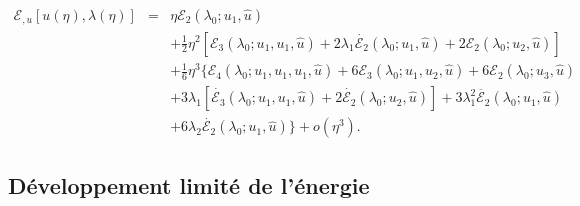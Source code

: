 \documentclass{article}
\begin{document}
\begin{eqnarray}
  \mathcal{E}_{, u} [u (\eta), \lambda (\eta)] & = & \eta \mathcal{E}_2
  (\lambda_0 ; u_1, \hat{u}) \nonumber\\
  &  &  + \tfrac{1}{2} \eta^2  [\mathcal{E}_3 (\lambda_0 ; u_1, u_1,
  \hat{u}) + 2 \lambda_1  \dot{\mathcal{E}_2} (\lambda_0 ; u_1, \hat{u}) +
  2\mathcal{E}_2 (\lambda_0 ; u_2, \hat{u})] \nonumber\\
  &  &  + \tfrac{1}{6} \eta^3  \{ \mathcal{E}_4 (\lambda_0 ; u_1,
  u_1, u_1, \hat{u}) + 6\mathcal{E}_3 (\lambda_0 ; u_1, u_2, \hat{u})
   + 6\mathcal{E}_2 (\lambda_0 ; u_3, \hat{u}) \nonumber\\
  &  &  + 3 \lambda_1  [\dot{\mathcal{E}_3} (\lambda_0 ; u_1, u_1,
  \hat{u}) + 2 \dot{\mathcal{E}_2} (\lambda_0 ; u_2, \hat{u})] + 3 \lambda_1^2
  \ddot{\mathcal{E}_2} (\lambda_0 ; u_1, \hat{u}) \nonumber\\
  &  &   + 6 \lambda_2  \dot{\mathcal{E}_2} (\lambda_0 ;
  u_1, \hat{u}) \} + o (\eta^3) .  \label{eq20220107080901}
\end{eqnarray}
\subsection{D{\'e}veloppement limit{\'e} de
l'{\'e}nergie}\label{sec20220121172919}
\end{document}
